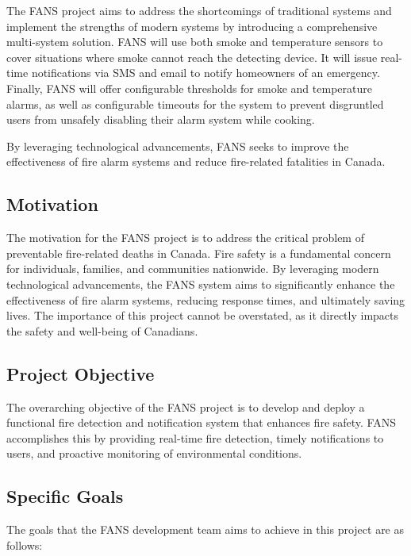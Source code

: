 The FANS project aims to address the shortcomings of traditional systems and implement the strengths of modern systems
by introducing a comprehensive multi-system solution. FANS will use both smoke and temperature sensors to cover
situations where smoke cannot reach the detecting device. It will issue real-time notifications via SMS and email to
notify homeowners of an emergency. Finally, FANS will offer configurable thresholds for smoke and temperature alarms,
as well as configurable timeouts for the system to prevent disgruntled users from unsafely disabling their alarm system
while cooking.

By leveraging technological advancements, FANS seeks to improve the effectiveness of fire alarm systems and reduce
fire-related fatalities in Canada.

\subsection{Motivation}

The motivation for the FANS project is to address the critical problem of preventable fire-related deaths in Canada.
Fire safety is a fundamental concern for individuals, families, and communities nationwide. By leveraging modern
technological advancements, the FANS system aims to significantly enhance the effectiveness of fire alarm systems,
reducing response times, and ultimately saving lives. The importance of this project cannot be overstated, as it
directly impacts the safety and well-being of Canadians.

\subsection{Project Objective}

The overarching objective of the FANS project is to develop and deploy a functional fire detection and notification
system that enhances fire safety. FANS accomplishes this by providing real-time fire detection, timely notifications to
users, and proactive monitoring of environmental conditions.

\subsection{Specific Goals}

The goals that the FANS development team aims to achieve in this project are as follows:

